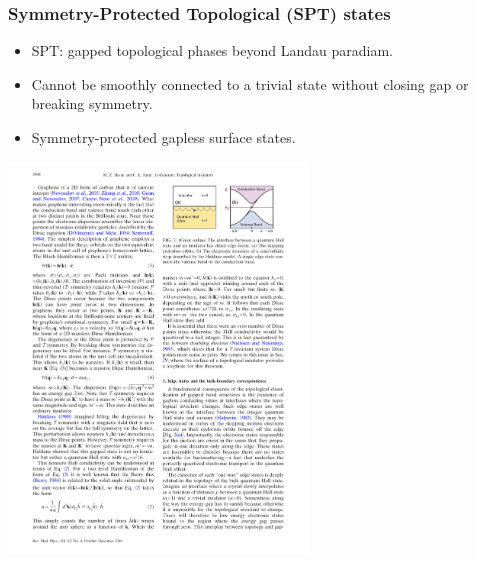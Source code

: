 \documentclass[xcolor=table, aspectratio=43,ignorenonframetext]{beamer}
\begin{document}
\begin{frame}
  \frametitle{Symmetry-Protected Topological (SPT) states}
\begin{itemize}
\item SPT: gapped topological phases beyond Landau paradiam.
\item Cannot be smoothly connected to a trivial state without closing gap or breaking symmetry.
\item Symmetry-protected gapless surface states.
\end{itemize}
\begin{center}
		\includegraphics[width=8cm]{../spspt/qhe_edge}
\end{center}
\end{frame}
\end{document}
